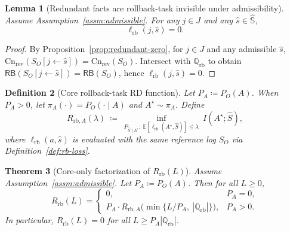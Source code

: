 \documentclass[twoside]{article}
\newtheorem{theorem}{Theorem}[section]
\newtheorem{definition}[theorem]{Definition}
\newtheorem{lemma}[theorem]{Lemma}
\newcommand{\Cn}{\mathrm{Cn}}
\newcommand{\E}{\mathbb{E}}
\newcommand{\1}{\mathbf{1}}
\begin{document}
\begin{lemma}[Redundant facts are rollback-task invisible under admissibility]
\label{lem:rb-loss-redundant}
Assume Assumption~\ref{assm:admissible}. For any \(j\in J\) and any \(\hat s\in\hat{\mathbb{S}}\),
\[
\ell_{\mathrm{rb}}(j,\hat s)=0.
\]
\end{lemma}
\begin{proof}
By Proposition~\ref{prop:redundant-zero}, for \(j\in J\) and any admissible \(\hat s\),
\(\Cn_{\mathrm{rev}}(S_O[j\leftarrow \hat s])=\Cn_{\mathrm{rev}}(S_O)\).
Intersect with \(\mathbb Q_{\mathrm{rb}}\) to obtain \(\mathsf{RB}(S_O[j\leftarrow \hat s])=\mathsf{RB}(S_O)\), hence \(\ell_{\mathrm{rb}}(j,\hat s)=0\).
\end{proof}

\begin{definition}[Core rollback-task RD function]
\label{def:Rrb-core}
Let \(P_A\coloneqq P_O(A)\). When \(P_A>0\), let \(\pi_A(\cdot)=P_O(\cdot\mid A)\) and \(A^\star\sim \pi_A\).
Define
\[
R_{\mathrm{rb},A}(\lambda)
\ \coloneqq\
\inf_{P_{\hat S\mid A^\star}:\ \E[\ell_{\mathrm{rb}}(A^\star,\hat S)]\le \lambda}\ I(A^\star;\hat S),
\]
where \(\ell_{\mathrm{rb}}(a,\hat s)\) is evaluated with the same reference log \(S_O\) via Definition~\ref{def:rb-loss}.
\end{definition}

\begin{theorem}[Core-only factorization of \(R_{\mathrm{rb}}(L)\)]
\label{thm:Rrb-factorization}
Assume Assumption~\ref{assm:admissible}. Let \(P_A\coloneqq P_O(A)\).
Then for all \(L\ge 0\),
\[
R_{\mathrm{rb}}(L)=
\begin{cases}
0, & P_A=0,\\[1mm]
P_A\cdot R_{\mathrm{rb},A}\!\bigl(\min\{L/P_A,\ |\mathbb Q_{\mathrm{rb}}|\}\bigr), & P_A>0.
\end{cases}
\]
In particular, \(R_{\mathrm{rb}}(L)=0\) for all \(L\ge P_A|\mathbb Q_{\mathrm{rb}}|\).
\end{theorem}
\end{document}
